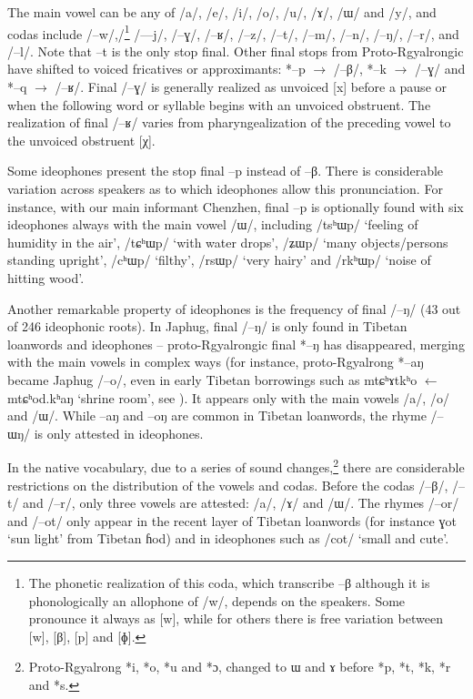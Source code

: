 \documentclass[oldfontcommands,oneside,a4paper,11pt]{article}
\newcommand{\ipa}[1]{{\phon \mbox{#1}}} %
\begin{document}
 The main vowel can be any of /\ipa{a}/,  /\ipa{e}/,  /\ipa{i}/,  /\ipa{o}/,  /\ipa{u}/,  /\ipa{ɤ}/,  /\ipa{ɯ}/ and /\ipa{y}/, and codas include /--\ipa{w}/,/\footnote{The  phonetic realization of this coda, which transcribe --\ipa{β} although it is phonologically an allophone of /w/, depends on the speakers. Some pronounce it always as [w], while for others there is free variation between [w], [β], [p] and [ɸ].  } /\ipa{---j}/, /\ipa{--ɣ}/, /\ipa{--ʁ}/, /\ipa{--z}/, /\ipa{--t}/, /\ipa{--m}/, /\ipa{--n}/, /\ipa{--ŋ}/, /\ipa{--r}/, and /\ipa{--l}/. Note that \ipa{--t} is the only stop final. Other final stops from Proto-Rgyalrongic have shifted to voiced fricatives or approximants: *--p $\rightarrow$ /\ipa{--β}/,  *--k $\rightarrow$ /\ipa{--ɣ}/ and  *--q $\rightarrow$ /\ipa{--ʁ}/. Final /\ipa{--ɣ}/ is generally realized as unvoiced [x] before a pause or when the following word or syllable begins with an unvoiced obstruent. The realization of final /\ipa{--ʁ}/ varies from pharyngealization of the preceding vowel to the  unvoiced obstruent [χ].
 
Some ideophones present  the stop final  \ipa{--p} instead of \ipa{--β}. There is considerable variation across speakers as to which ideophones allow this pronunciation. For instance, with our main informant Chenzhen, final \ipa{--p} is optionally found with six ideophones always with the main vowel /\ipa{ɯ}/, including /\ipa{tsʰɯp}/ `feeling of humidity in the air', /\ipa{tɕʰɯp}/ `with water drops', /\ipa{ʑɯp}/ `many objects/persons standing upright', /\ipa{cʰɯp}/ `filthy', /\ipa{rsɯp}/ `very hairy' and /\ipa{rkʰɯp}/ `noise of hitting wood'.

Another remarkable property of ideophones is the frequency of final /\ipa{--ŋ}/ (43 out of 246 ideophonic roots). In Japhug, final /\ipa{--ŋ}/ is only found in Tibetan loanwords and ideophones -- proto-Rgyalrongic final *--ŋ has disappeared, merging with the main vowels in complex ways  (for instance, proto-Rgyalrong *--aŋ became Japhug /\ipa{--o}/, even in early Tibetan borrowings such as \ipa{mtɕʰɤtkʰo} $\leftarrow$ \ipa{mtɕʰod.kʰaŋ} `shrine room', see \citealt[228]{jacques04these}). It appears only with the main vowels /\ipa{a}/, /\ipa{o}/ and /\ipa{ɯ}/. While \ipa{--aŋ} and \ipa{--oŋ} are common in Tibetan loanwords, the rhyme /\ipa{--ɯŋ}/ is only attested in ideophones.

In the native vocabulary, due to a series of sound changes,\footnote{Proto-Rgyalrong *i,  *o, *u and *ɔ, changed to \ipa{ɯ} and \ipa{ɤ} before *p, *t, *k, *r and *s. } there are considerable restrictions on the distribution of the vowels and codas. Before the codas /\ipa{--β}/,  /\ipa{--t}/ and /\ipa{--r}/, only three vowels are attested: /\ipa{a}/, /\ipa{ɤ}/ and /\ipa{ɯ}/. The rhymes    /\ipa{--or}/ and /\ipa{--ot}/ only appear in the recent layer of Tibetan loanwords (for instance \ipa{ɣot} `sun light' from Tibetan \ipa{ɦod}) and in ideophones such as /\ipa{cot}/ `small and cute'.
\end{document}
